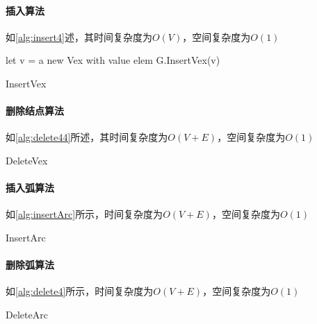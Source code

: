 \paragraph{插入算法}如\autoref{alg:insert4}述，其时间复杂度为$O(V)$，空间复杂度为$O(1)$
\par
\begin{algorithm}[H]
    \SetAlgoLined
    let v = a new Vex with value elem\;
    G.InsertVex(v)\;
\caption{InsertVex}\label{alg:insert4}
\end{algorithm}
\paragraph{删除结点算法}如\autoref{alg:delete44}所述，其时间复杂度为$O(V+E)$，空间复杂度为$O(1)$
\begin{algorithm}[th]
    \SetAlgoLined
\caption{DeleteVex}\label{alg:delete44}
\end{algorithm}
\paragraph{插入弧算法}如\autoref{alg:insertArc}所示，时间复杂度为$O(V+E)$，空间复杂度为$O(1)$
\par
\begin{algorithm}[H]
    \SetAlgoLined
    \caption{InsertArc}\label{alg:insertArc}
\end{algorithm}
\paragraph{删除弧算法}如\autoref{alg:delete4}所示，时间复杂度为$O(V+E)$，空间复杂度为$O(1)$
\par
\begin{algorithm}[H]
    \SetAlgoLined
    \caption{DeleteArc}\label{alg:delete4}
\end{algorithm}
